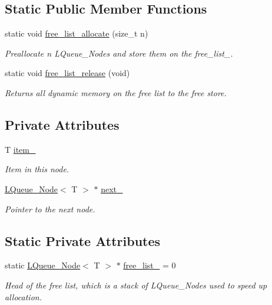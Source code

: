 \subsection*{Static Public Member Functions}
\begin{DoxyCompactItemize}
\item 
static void \hyperlink{classMadara_1_1Utility_1_1LQueue__Node_ada809da5428e23cd41db85c4e079b3c9}{free\_\-list\_\-allocate} (size\_\-t n)
\begin{DoxyCompactList}\small\item\em Preallocate n {\itshape LQueue\_\-Nodes\/} and store them on the {\itshape free\_\-list\_\-\/}. \item\end{DoxyCompactList}\item 
static void \hyperlink{classMadara_1_1Utility_1_1LQueue__Node_ad4b90aadfac2a5719fc5167da173cc40}{free\_\-list\_\-release} (void)
\begin{DoxyCompactList}\small\item\em Returns all dynamic memory on the free list to the free store. \item\end{DoxyCompactList}\end{DoxyCompactItemize}
\subsection*{Private Attributes}
\begin{DoxyCompactItemize}
\item 
T \hyperlink{classMadara_1_1Utility_1_1LQueue__Node_a2c49811b037ab88ab481460e13e9a660}{item\_\-}
\begin{DoxyCompactList}\small\item\em Item in this node. \item\end{DoxyCompactList}\item 
\hyperlink{classMadara_1_1Utility_1_1LQueue__Node}{LQueue\_\-Node}$<$ T $>$ $\ast$ \hyperlink{classMadara_1_1Utility_1_1LQueue__Node_a6ba29b70a8889befb70f4bdce165a77d}{next\_\-}
\begin{DoxyCompactList}\small\item\em Pointer to the next node. \item\end{DoxyCompactList}\end{DoxyCompactItemize}
\subsection*{Static Private Attributes}
\begin{DoxyCompactItemize}
\item 
static \hyperlink{classMadara_1_1Utility_1_1LQueue__Node}{LQueue\_\-Node}$<$ T $>$ $\ast$ \hyperlink{classMadara_1_1Utility_1_1LQueue__Node_a18ff36ca19cbdbc04ce11b8b20fe5fdf}{free\_\-list\_\-} = 0
\begin{DoxyCompactList}\small\item\em Head of the free list, which is a stack of {\itshape LQueue\_\-Nodes\/} used to speed up allocation. \item\end{DoxyCompactList}\end{DoxyCompactItemize}
